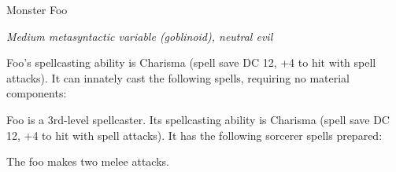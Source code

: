 \documentclass[letterpaper,10pt,twoside,twocolumn,openany]{dndbook}
\begin{document}
\begin{monsterbox}{Monster Foo}
  \begin{hangingpar}
    \textit{Medium metasyntactic variable (goblinoid), neutral evil}
  \end{hangingpar}
  \dndline%
  \basics[%
  armorclass = 9 (12 with \emph{mage armor}),
  hitpoints  = \dice{3d8 + 3},
  speed      = {30 ft., fly 30 ft.},
  ]
  \dndline%
  \stats[
    STR = \stat{12}, %
    DEX = \stat{8},
    CON = \stat{13},
    INT = \stat{10},
    WIS = \stat{14},
    CHA = \stat{15},
  ]
  \dndline%
  \details[%
    senses = {darkvision 60 ft., passive Perception 10},
    languages = {Common, Goblin},
    challenge = {1},
  ]
  \dndline%

  \begin{monsteraction}
    Foo's spellcasting ability is Charisma (spell save DC 12, +4 to hit with spell attacks). It can innately cast the following spells, requiring no material components:
  \end{monsteraction}

  \begin{monsteraction}[Spellcasting]
    Foo is a 3rd-level spellcaster. Its spellcasting ability is Charisma (spell save DC 12, +4 to hit with spell attacks). It has the following sorcerer spells prepared:
  \end{monsteraction}

  \begin{monsteraction}[Multiattack]
    The foo makes two melee attacks.
  \end{monsteraction}


\end{monsterbox}
\end{document}
